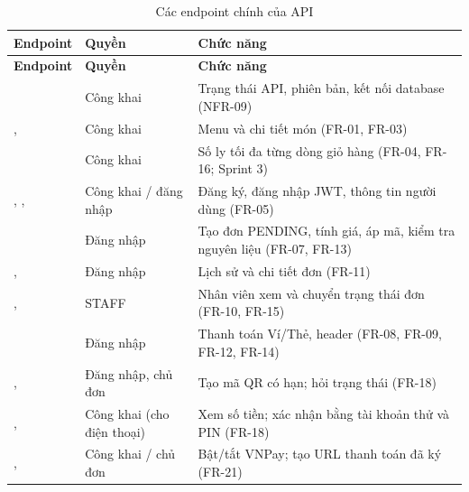 \begin{longtable}{@{}L{5.2cm}L{2.2cm}L{6.4cm}@{}}
\caption{Các endpoint chính của API}\label{tab:endpoint}\\
\toprule
\textbf{Endpoint} & \textbf{Quyền} & \textbf{Chức năng} \\ \midrule \endfirsthead
\toprule \textbf{Endpoint} & \textbf{Quyền} & \textbf{Chức năng} \\ \midrule \endhead
\bottomrule \endfoot
{} & Công khai & Trạng thái API, phiên bản, kết nối database (NFR-09) \\
,  & Công khai & Menu và chi tiết món (FR-01, FR-03) \\
 & Công khai & Số ly tối đa từng dòng giỏ hàng (FR-04, FR-16; Sprint 3) \\
, ,  & Công khai / đăng nhập & Đăng ký, đăng nhập JWT, thông tin người dùng (FR-05) \\
 & Đăng nhập & Tạo đơn PENDING, tính giá, áp mã, kiểm tra nguyên liệu (FR-07, FR-13) \\
,  & Đăng nhập & Lịch sử và chi tiết đơn (FR-11) \\
,  & STAFF & Nhân viên xem và chuyển trạng thái đơn (FR-10, FR-15) \\
 & Đăng nhập & Thanh toán Ví/Thẻ, header  (FR-08, FR-09, FR-12, FR-14) \\
,  & Đăng nhập, chủ đơn & Tạo mã QR có hạn; hỏi trạng thái (FR-18) \\
,  & Công khai (cho điện thoại) & Xem số tiền; xác nhận bằng tài khoản thử và PIN (FR-18) \\
,  & Công khai / chủ đơn & Bật/tắt VNPay; tạo URL thanh toán đã ký (FR-21) \\

\end{longtable}

